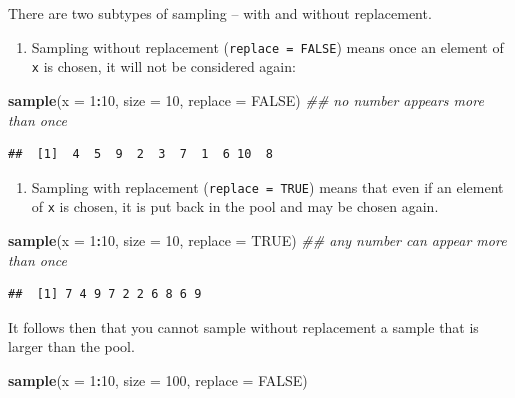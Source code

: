 \documentclass[]{book}
\newenvironment{Shaded}{\begin{snugshade}}{\end{snugshade}}
\newcommand{\CommentTok}[1]{\textcolor[rgb]{0.56,0.35,0.01}{\textit{#1}}}
\newcommand{\DataTypeTok}[1]{\textcolor[rgb]{0.13,0.29,0.53}{#1}}
\newcommand{\DecValTok}[1]{\textcolor[rgb]{0.00,0.00,0.81}{#1}}
\newcommand{\KeywordTok}[1]{\textcolor[rgb]{0.13,0.29,0.53}{\textbf{#1}}}
\newcommand{\NormalTok}[1]{#1}
\newcommand{\OperatorTok}[1]{\textcolor[rgb]{0.81,0.36,0.00}{\textbf{#1}}}
\newcommand{\OtherTok}[1]{\textcolor[rgb]{0.56,0.35,0.01}{#1}}
\providecommand{\tightlist}{%
  \setlength{\itemsep}{0pt}\setlength{\parskip}{0pt}}
\theoremstyle{definition}
\theoremstyle{definition}
\theoremstyle{definition}
\theoremstyle{remark}
\begin{document}
There are two subtypes of sampling -- with and without replacement.

\begin{enumerate}
\def\labelenumi{\arabic{enumi}.}
\tightlist
\item
  Sampling without replacement (\texttt{replace\ =\ FALSE}) means once an element of \texttt{x} is chosen, it will not be considered again:
\end{enumerate}

\begin{Shaded}
\begin{Highlighting}[]
\KeywordTok{sample}\NormalTok{(}\DataTypeTok{x =} \DecValTok{1}\OperatorTok{:}\DecValTok{10}\NormalTok{, }\DataTypeTok{size =} \DecValTok{10}\NormalTok{, }\DataTypeTok{replace =} \OtherTok{FALSE}\NormalTok{) }\CommentTok{## no number appears more than once}
\end{Highlighting}
\end{Shaded}

\begin{verbatim}
##  [1]  4  5  9  2  3  7  1  6 10  8
\end{verbatim}

\begin{enumerate}
\def\labelenumi{\arabic{enumi}.}
\setcounter{enumi}{1}
\tightlist
\item
  Sampling with replacement (\texttt{replace\ =\ TRUE}) means that even if an element of \texttt{x} is chosen, it is put back in the pool and may be chosen again.
\end{enumerate}

\begin{Shaded}
\begin{Highlighting}[]
\KeywordTok{sample}\NormalTok{(}\DataTypeTok{x =} \DecValTok{1}\OperatorTok{:}\DecValTok{10}\NormalTok{, }\DataTypeTok{size =} \DecValTok{10}\NormalTok{, }\DataTypeTok{replace =} \OtherTok{TRUE}\NormalTok{) }\CommentTok{## any number can appear more than once}
\end{Highlighting}
\end{Shaded}

\begin{verbatim}
##  [1] 7 4 9 7 2 2 6 8 6 9
\end{verbatim}

It follows then that you cannot sample without replacement a sample that is larger than the pool.

\begin{Shaded}
\begin{Highlighting}[]
\KeywordTok{sample}\NormalTok{(}\DataTypeTok{x =} \DecValTok{1}\OperatorTok{:}\DecValTok{10}\NormalTok{, }\DataTypeTok{size =} \DecValTok{100}\NormalTok{, }\DataTypeTok{replace =} \OtherTok{FALSE}\NormalTok{)}
\end{Highlighting}
\end{Shaded}
\end{document}
